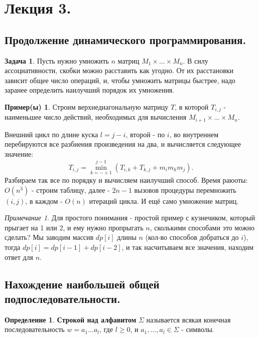\documentclass[a4paper]{article}
\theoremstyle{indented}
\theoremstyle{definition}
\newtheorem{defn}{Определение}
\newtheorem{exl}{Пример(ы)}
\newtheorem{prob}{Задача}
\theoremstyle{remark}
\newtheorem{remark}{Примечание}
\begin{document}
\section{Лекция 3.}

\subsection{Продолжение динамического программирования.}

\begin{prob}
    Пусть нужно умножить $n$ матриц $M_1 \times \ldots \times M_n$. В силу ассоциативности, скобки можно расставить как угодно. От их расстановки зависит общее число операций, и, чтобы умножить матрицы быстрее, надо заранее определить наилучший порядок их умножения.
\end{prob}

\begin{exl}
    Строим верхнедиагональную матрицу $T$, в которой $T_{i, j}$ - наименьшее число действий, необходимых для вычисления $M_{i+1} \times \ldots \times M_n$. \ 

    Внешний цикл по длине куска $l=j-i$, второй - по $i$, во внутреннем перебируются все разбиения произведения на два, и вычисляется следующее значение:
    \[
        T_{i, j}=\min_{k=-+1}^{j-1}(T_{i, k}+T_{k, j}+m_im_km_j). 
    \]
    Разбираем так все по порядку и вычисляем наилучший способ. Время раюоты: $O(n^3)$ - строим таблицу, далее - $2n-1$ вызовов процедуры перемножить $(i, j)$, в каждом - $O(n)$ итераций цикла. И ещё само умножение матриц.
\end{exl}

\begin{remark}
    Для простого понимания - простой пример с кузнечиком, который прыгает на 1 или 2, и ему нужно пропрыгать $n$, сколькими способами это можно сделать? Мы заводим массив $dp[i]$ длины $n$ (кол-во способов добраться до $i$), тогда $dp[i]=dp[i-1]+dp[i-2]$, и так насчитываем все значения, находим ответ для $n$. 
\end{remark}

\subsection{Нахождение наибольшей общей подпоследовательности.}

\begin{defn}
    \textbf{Строкой над алфавитом} $\Sigma$ называется всякая конечная последовательность $w=a_1\ldots a_l$, где $l\geq 0$, и $a_1, \ldots, a_l \in \Sigma$ - символы.
\end{defn}
\end{document}
